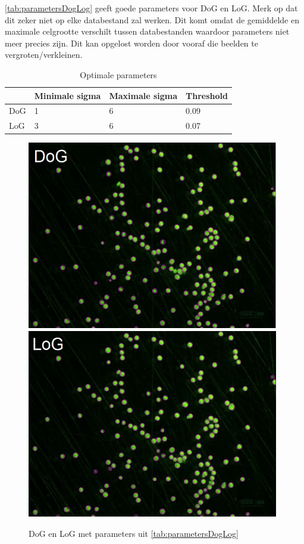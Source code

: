 \documentclass{article}
\begin{document}
\begin{multicols}{2}
\autoref{tab:parametersDogLog} geeft goede parameters voor DoG en LoG. Merk op dat dit zeker niet op elke databestand zal werken. Dit komt omdat de gemiddelde en maximale celgrootte verschilt tussen databestanden waardoor parameters niet meer precies zijn. Dit kan opgelost worden door vooraf die beelden te vergroten/verkleinen.
\begin{table}[H]
\begin{tabular}{ |p{1cm}|p{1.5cm}|p{1.5cm}|p{1.5cm}|  }
\hline
 & Minimale sigma & Maximale sigma & Threshold \\
\hline
DoG & 1 & 6 & 0.09 \\
LoG & 3   & 6 & 0.07\\
\hline
\end{tabular}
\caption{Optimale parameters}
\label{tab:parametersDogLog}
\end{table}

\begin{figure}[H]
\centering
\includegraphics[width=0.98\textwidth]{images/dog_good.jpg}
\includegraphics[width=0.98\textwidth]{images/log_good.jpg}
\caption{\label{fig:dog_log_good}DoG en LoG met parameters uit \autoref{tab:parametersDogLog}}
\end{figure}


\end{multicols}
\end{document}
